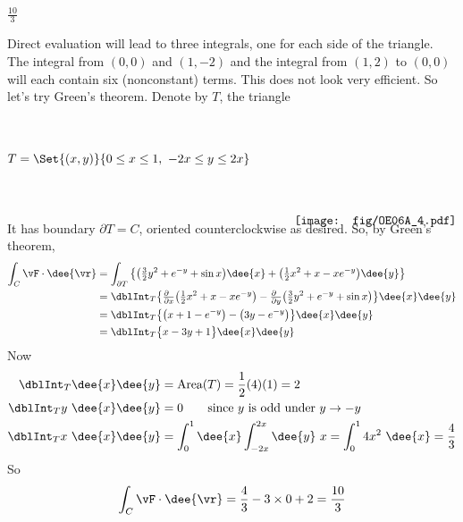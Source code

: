 \begin{answer}
$\frac{10}{3}$
\end{answer}

\begin{solution}
Direct evaluation will lead to three integrals, one for each side of the
triangle. The integral from $(0,0)$ and $(1,-2)$ and the integral from
$(1,2)$ to $(0,0)$ will each contain six (nonconstant) terms. This
does not look very efficient.
So let's try Green's theorem. Denote by $T$, the triangle
\begin{equation*}
T = \Set{(x,y)}{0\le x\le 1,\ -2x\le y\le 2x} \hskip0.5in
\raisebox{-50pt}[40pt][40pt]{\texttt{[image: fig/OE06A\_4.pdf]}}
\end{equation*}
It has boundary $\partial T=C$, oriented counterclockwise as desired.
So, by Green's theorem,
\begin{align*}
\int_C \vF\cdot\dee{\vr}
&= \int_{\partial T} \big\{\big(\tfrac{3}{2}y^2 + e^{-y} +\sin x\big)\dee{x}
               +\big(\tfrac{1}{2}x^2+x-x e^{-y}\big)\dee{y}\big\} \\
&= \dblInt_T \big\{
    \tfrac{\partial\hfill}{\partial x}\big(\tfrac{1}{2}x^2+x-x e^{-y}\big)
   -\tfrac{\partial\hfill}{\partial y}\big(\tfrac{3}{2}y^2 + e^{-y} +\sin x\big)
               \big\}\dee{x}\dee{y}
\\
&= \dblInt_T \big\{
             \big(x + 1-e^{-y}\big)
           - \big(3y - e^{-y} \big)
               \big\}\dee{x}\dee{y} \\
&= \dblInt_T \big\{ x -3y + 1 \big\}\dee{x}\dee{y}
\end{align*}
Now
\begin{align*}
\dblInt_T  \dee{x}\dee{y} &=\text{Area}(T) = \frac{1}{2}(4)(1) = 2 \\
\dblInt_T  y\ \dee{x}\dee{y} &= 0
   \qquad\text{since $y$ is odd under $y\rightarrow-y$} \\
\dblInt_T  x\ \dee{x}\dee{y}
&=\int_0^1\dee{x}\int_{-2x}^{2x} \dee{y}\ x
 =\int_0^1 4x^2\ \dee{x}
 =\frac{4}{3}
\end{align*}
So
\begin{equation*}
\int_C \vF\cdot\dee{\vr} = \frac{4}{3}-3\times 0 +2 =\frac{10}{3}
\end{equation*}
\end{solution}

